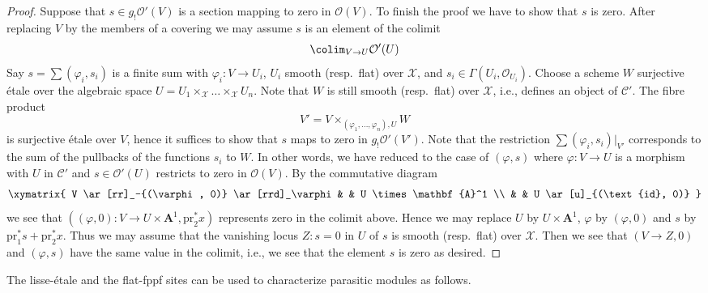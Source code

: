 \begin{proof}
\medskip\noindent
Suppose that $s \in g_!\mathcal{O}'(V)$ is a section
mapping to zero in $\mathcal{O}(V)$. To finish the proof we have to show
that $s$ is zero. After replacing $V$ by the members
of a covering we may assume $s$ is an element of the colimit
$$
\colim_{V \to U} \mathcal{O}'(U)
$$
Say $s = \sum (\varphi_i, s_i)$ is a finite sum with
$\varphi_i : V \to U_i$, $U_i$ smooth (resp.\ flat) over $\mathcal{X}$, and
$s_i \in \Gamma(U_i, \mathcal{O}_{U_i})$. Choose a scheme $W$ surjective
\'etale over the algebraic space
$U = U_1 \times_\mathcal{X} \ldots \times_\mathcal{X} U_n$.
Note that $W$ is still smooth (resp.\ flat) over $\mathcal{X}$, i.e.,
defines an object of $\mathcal{C}'$. The fibre product
$$
V' = V \times_{(\varphi_1, \ldots, \varphi_n), U} W
$$
is surjective \'etale over $V$, hence it suffices to show that $s$ maps
to zero in $g_!\mathcal{O}'(V')$. Note that the restriction
$\sum (\varphi_i, s_i)|_{V'}$ corresponds to the sum of the pullbacks
of the functions $s_i$ to $W$. In other words, we have reduced to the case
of $(\varphi, s)$ where $\varphi : V \to U$ is a morphism with $U$ in
$\mathcal{C}'$ and $s \in \mathcal{O}'(U)$ restricts to zero in
$\mathcal{O}(V)$. By the commutative diagram
$$
\xymatrix{
V \ar[rr]_-{(\varphi, 0)} \ar[rrd]_\varphi & & U \times \mathbf{A}^1 \\
& & U \ar[u]_{(\text{id}, 0)}
}
$$
we see that
$((\varphi, 0) : V \to U \times \mathbf{A}^1, \text{pr}_2^*x)$
represents zero in the colimit above. Hence we may
replace $U$ by $U \times \mathbf{A}^1$, $\varphi$ by $(\varphi, 0)$
and $s$ by $\text{pr}_1^*s + \text{pr}_2^*x$. Thus we may assume that
the vanishing locus $Z : s = 0$ in $U$ of $s$ is smooth (resp.\ flat)
over $\mathcal{X}$. Then we see that $(V \to Z, 0)$ and $(\varphi, s)$
have the same value in the colimit, i.e., we see that the element $s$
is zero as desired.
\end{proof}

\noindent
The lisse-\'etale and the flat-fppf sites can be used to characterize
parasitic modules as follows.


